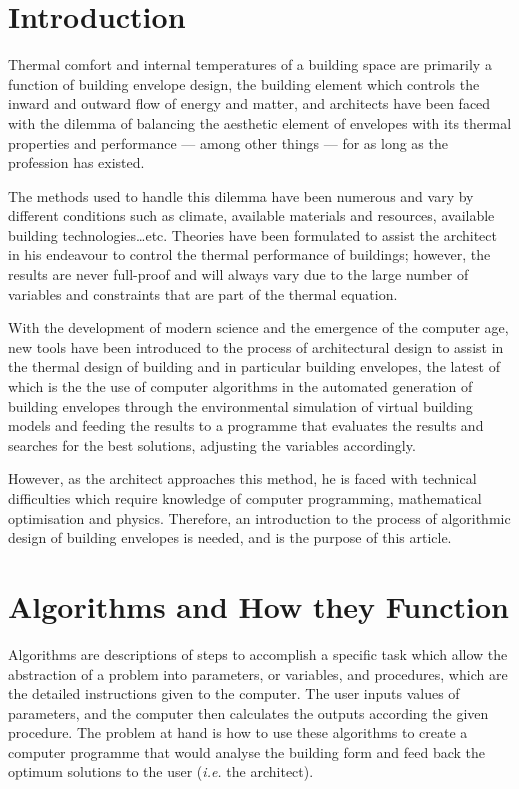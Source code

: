 \documentclass[11pt,a4paper,oneside]{article}
\begin{document}
\begin{multicols}{2}

\section*{Introduction}

Thermal comfort and internal temperatures of a building space are primarily a function of building envelope design, the building element which controls the inward and outward flow of energy and matter, and architects have been faced with the dilemma of balancing the aesthetic element of envelopes with its thermal properties and performance --- among other things --- for as long as the profession has existed.

The methods used to handle this dilemma have been numerous and vary by different conditions such as climate, available materials and resources, available building technologies\ldots{}etc. Theories have been formulated to assist the architect in his endeavour to control the thermal performance of buildings; however, the results are never full-proof and will always vary due to the large number of variables and constraints that are part of the thermal equation.

With the development of modern science and the emergence of the computer age, new tools have been introduced to the process of architectural design to assist in the thermal design of building and in particular building envelopes, the latest of which is the the use of computer algorithms in the automated generation of building envelopes through the environmental simulation of virtual building models and feeding the results to a programme that evaluates the results and searches for the best solutions, adjusting the variables accordingly.

However, as the architect approaches this method, he is faced with technical difficulties which require knowledge of computer programming, mathematical optimisation and physics. Therefore, an introduction to the process of algorithmic design of building envelopes is needed, and is the purpose of this article.

\section{Algorithms and How they Function}

Algorithms are descriptions of steps to accomplish a specific task which allow the abstraction of a problem into parameters, or variables, and procedures, which are the detailed instructions given to the computer. The user inputs values of parameters, and the computer then calculates the outputs according the given procedure. The problem at hand is how to use these algorithms to create a computer programme that would analyse the building form and feed back the optimum solutions to the user (\emph{i.e.} the architect). 


\end{multicols}
\end{document}
